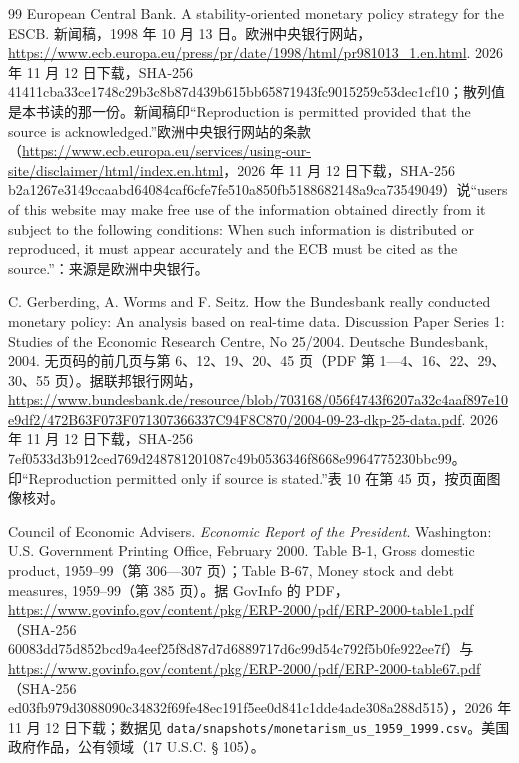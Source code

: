 \begin{thebibliography}{99}
 European Central Bank. A stability-oriented monetary policy strategy for the ESCB. 新闻稿，1998 年 10 月 13 日。欧洲中央银行网站，\url{https://www.ecb.europa.eu/press/pr/date/1998/html/pr981013_1.en.html}. 2026 年 11 月 12 日下载，SHA-256 41411cba33ce1748c29b3c8b87d439b615bb65871943fc9015259c53dec1cf10；散列值是本书读的那一份。新闻稿印“Reproduction is permitted provided that the source is acknowledged.”欧洲中央银行网站的条款（\url{https://www.ecb.europa.eu/services/using-our-site/disclaimer/html/index.en.html}，2026 年 11 月 12 日下载，SHA-256 b2a1267e3149ccaabd64084caf6cfe7fe510a850fb5188682148a9ca73549049）说“users of this website may make free use of the information obtained directly from it subject to the following conditions: When such information is distributed or reproduced, it must appear accurately and the ECB must be cited as the source.”：来源是欧洲中央银行。

 C. Gerberding, A. Worms and F. Seitz. How the Bundesbank really conducted monetary policy: An analysis based on real-time data. Discussion Paper Series 1: Studies of the Economic Research Centre, No 25/2004. Deutsche Bundesbank, 2004. 无页码的前几页与第 6、12、19、20、45 页（PDF 第 1—4、16、22、29、30、55 页）。据联邦银行网站，\url{https://www.bundesbank.de/resource/blob/703168/056f4743f6207a32c4aaf897e10e9df2/472B63F073F071307366337C94F8C870/2004-09-23-dkp-25-data.pdf}. 2026 年 11 月 12 日下载，SHA-256 7ef0533d3b912ced769d248781201087c49b0536346f8668e9964775230bbc99。印“Reproduction permitted only if source is stated.”表 10 在第 45 页，按页面图像核对。

 Council of Economic Advisers. \emph{Economic Report of the President}. Washington: U.S. Government Printing Office, February 2000. Table B-1, Gross domestic product, 1959--99（第 306—307 页）；Table B-67, Money stock and debt measures, 1959--99（第 385 页）。据 GovInfo 的 PDF，\url{https://www.govinfo.gov/content/pkg/ERP-2000/pdf/ERP-2000-table1.pdf}（SHA-256 60083dd75d852bcd9a4eef25f8d87d7d6889717d6c99d54c792f5b0fe922ee7f）与 \url{https://www.govinfo.gov/content/pkg/ERP-2000/pdf/ERP-2000-table67.pdf}（SHA-256 ed03fb979d3088090c34832f69fe48ec191f5ee0d841c1dde4ade308a288d515），2026 年 11 月 12 日下载；数据见 \texttt{data/snapshots/monetarism\_us\_1959\_1999.csv}。美国政府作品，公有领域（17 U.S.C. § 105）。


\end{thebibliography}
